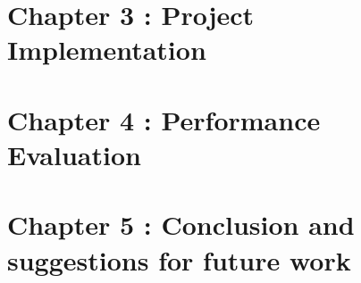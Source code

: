 \documentclass{article}
\begin{document}
\section{Chapter 3 : Project Implementation}

\section{Chapter 4 : Performance Evaluation}
\section{Chapter 5 : Conclusion and suggestions for future work}
\end{document}
